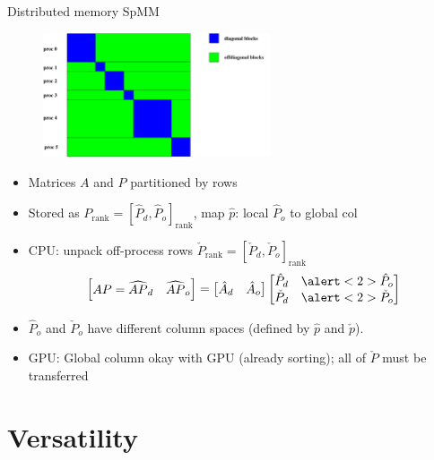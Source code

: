 \documentclass{beamer}
\begin{document}
\begin{frame}{Distributed memory SpMM}
  \begin{figure}
    \centering
    \includegraphics[width=0.6\textwidth]{figures/Mat/parallelSparseMatrix}
  \end{figure}
  \begin{itemize}
  \item Matrices $A$ and $P$ partitioned by rows
  \item Stored as $P_{\text{rank}} = [\hat P_d, \hat P_o]_{\text{rank}}$, map $\hat p$: local $\hat P_o$ to global col
  \item CPU: unpack off-process rows $\check P_{\text{rank}} = [\check P_d, \check P_o]_{\text{rank}}$
    \begin{equation*}
      \begin{bmatrix}
        AP = \widehat{AP}_d & \widehat{AP}_o
      \end{bmatrix}
      =
      \begin{bmatrix}
        \hat A_d & \hat A_o
      \end{bmatrix}
      \begin{bmatrix}
        \hat P_d & \alert<2>{\hat P_o} \\
        \check P_d & \alert<2>{\check P_o}
      \end{bmatrix}
    \end{equation*}
  \item<2-> \alert<2>{$\hat P_o$ and $\check P_o$ have different column spaces (defined by $\hat p$ and $\check p$).}
  \item<3> GPU: Global column okay with GPU (already sorting); all of $\check P$ must be transferred
  \end{itemize}
\end{frame}

\section{Versatility}
\end{document}
